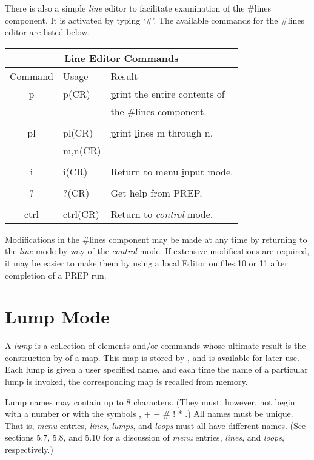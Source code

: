 There is also a simple {\em line} editor to facilitate examination of the
\#lines component. It is activated by typing `\#'. The available commands
for the \#lines editor are listed below.
\begin{table}
\begin{center}
\begin{tabular}{|c|l|l|} \hline
\multicolumn{3}{|c|}{Line Editor Commands}\\ \hline Command & Usage &
Result\\ \hline p & p(CR) & {\underline p}rint the entire contents of\\ & &
the \#lines component.\\ & &\\ pl & pl(CR) & {\underline p}rint {\underline
l}ines m through n.\\ & m,n(CR) &\\ & &\\ i & i(CR) & Return to menu
{\underline i}nput mode.\\ & &\\ ? & ?(CR) & Get help from PREP.\\ & &\\
ctrl & ctrl(CR) & Return to {\em control} mode.\\ \hline
\end{tabular}
\end{center}
\end{table}

Modifications in the \#lines component may be made at any time by returning
to the {\em line} mode by way of the {\em control} mode. If extensive
modifications are required, it may be easier to make them by using a local
Editor on files 10 or 11 after completion of a PREP run.

\section{Lump Mode} A {\em lump} is a collection of elements and/or
commands whose ultimate result is the construction by \Mary of a map. This
map is stored by
\Maryend, and is available for later use. Each lump is given a user
specified name, and each time the name of a particular lump is invoked, the
corresponding map is recalled from memory.

Lump names may contain up to 8 characters. (They must, however, not begin
with a number or with the symbols , + $-$ \# ! * .) All names must be
unique. That is, {\em menu} entries, {\em lines}, {\em lumps}, and {\em
loops} must all have different names. (See sections 5.7, 5.8, and 5.10 for
a discussion of {\em menu} entries, {\em lines}, and {\em loops},
respectively.)

